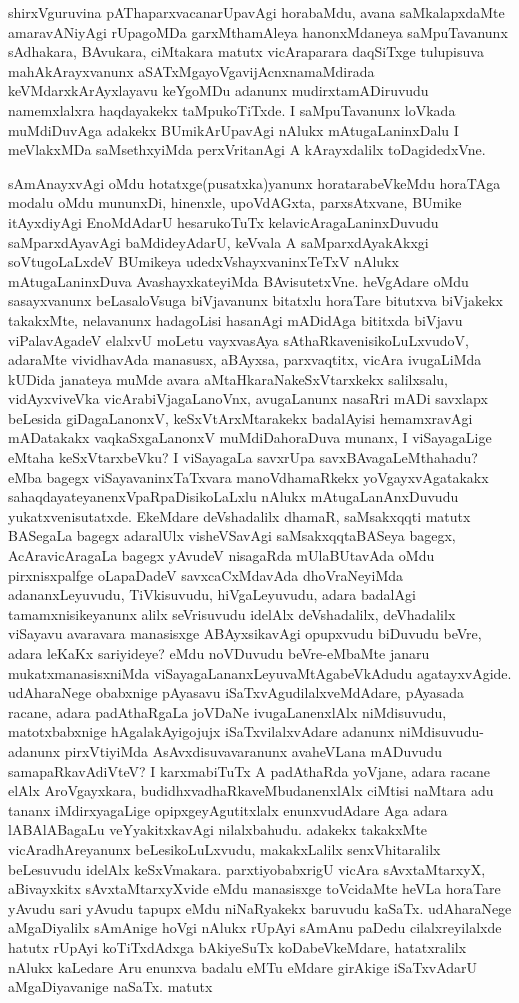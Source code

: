 shirxVguruvina pAThaparxvacanarUpavAgi horabaMdu, avana saMkalapxdaMte amaravANiyAgi rUpagoMDa garxMthamAleya hanonxMdaneya saMpuTavanunx sAdhakara, BAvukara, ciMtakara matutx vicAraparara daqSiTxge tulupisuva mahAkArayxvanunx aSATxMgayoVgavijAcnxnamaMdirada keVMdarxkArAyxlayavu keYgoMDu adanunx mudirxtamADiruvudu namemxlalxra haqdayakekx taMpukoTiTxde. I saMpuTavanunx loVkada muMdiDuvAga adakekx BUmikArUpavAgi nAlukx mAtugaLaninxDalu I meVlakxMDa saMsethxyiMda perxVritanAgi A kArayxdalilx toDagidedxVne.

sAmAnayxvAgi oMdu hotatxge(pusatxka)yanunx horatarabeVkeMdu horaTAga modalu oMdu  mununxDi, hinenxle, upoVdAGxta, parxsAtxvane, BUmike itAyxdiyAgi EnoMdAdarU hesarukoTuTx kelavicAragaLaninxDuvudu saMparxdAyavAgi baMdideyAdarU, keVvala A saMparxdAyakAkxgi soVtugoLaLxdeV BUmikeya udedxVshayxvaninxTeTxV nAlukx mAtugaLaninxDuva AvashayxkateyiMda BAvisutetxVne. heVgAdare oMdu sasayxvanunx beLasaloVsuga biVjavanunx bitatxlu horaTare bitutxva biVjakekx takakxMte, nelavanunx hadagoLisi hasanAgi mADidAga bititxda biVjavu viPalavAgadeV elalxvU moLetu vayxvasAya sAthaRkavenisikoLuLxvudoV, adaraMte vividhavAda \hbox{manasusx}, aBAyxsa, parxvaqtitx, vicAra ivugaLiMda kUDida janateya muMde avara aMtaHkaraNakeSxVtarxkekx salilxsalu, vidAyxviveVka vicArabiVjagaLanoVnx, avugaLanunx nasaRri mADi savxlapx beLesida giDagaLanonxV, keSxVtArxMtarakekx badalAyisi hemamxravAgi mADatakakx vaqkaSxgaLanonxV muMdiDahoraDuva munanx, I viSayagaLige eMtaha keSxVtarxbeVku? I viSayagaLa savxrUpa savxBAvagaLeMthahadu? eMba bagegx viSayavaninxTaTxvara manoVdhamaRkekx yoVgayxvAgatakakx sahaqdayateyanenxVpaRpaDisikoLaLxlu nAlukx mAtugaLanAnxDuvudu yukatxvenisutatxde. EkeMdare deVshadalilx dhamaR, saMsakxqqti matutx BASegaLa bagegx adaralUlx visheVSavAgi saMsakxqqtaBASeya bagegx, AcAravicAragaLa bagegx yAvudeV nisagaRda mUlaBUtavAda oMdu pirxnisxpalfge oLapaDadeV savxcaCxMdavAda dhoVraNeyiMda adananxLeyuvudu, TiVkisuvudu, hiVgaLeyuvudu, adara badalAgi tamamxnisikeyanunx alilx seVrisuvudu idelAlx deVshadalilx, deVhadalilx viSayavu avaravara manasisxge ABAyxsikavAgi opupxvudu biDuvudu beVre, adara leKaKx sariyideye? eMdu noVDuvudu beVre-eMbaMte janaru mukatxmanasisxniMda viSayagaLananxLeyuvaMtAgabeVkAdudu agatayxvAgide. udAharaNege obabxnige pAyasavu iSaTxvAgudilalxveMdAdare, pAyasada racane, adara padAthaRgaLa  joVDaNe ivugaLanenxlAlx niMdisuvudu, matotxbabxnige hAgalakAyigojujx iSaTxvilalxvAdare adanunx niMdisuvudu- adanunx pirxVtiyiMda AsAvxdisuvavaranunx avaheVLana mADuvudu samapaRkavAdiVteV? I karxmabiTuTx A padAthaRda yoVjane, adara racane elAlx AroVgayxkara, budidhxvadhaRkaveMbudanenxlAlx ciMtisi naMtara adu tananx iMdirxyagaLige opipxgeyAgutitxlalx enunxvudAdare Aga adara lABAlABagaLu veYyakitxkavAgi nilalxbahudu. adakekx takakxMte vicAradhAreyanunx beLesikoLuLxvudu, makakxLalilx senxVhitaralilx beLesuvudu idelAlx keSxVmakara. parxtiyobabxrigU vicAra sAvxtaMtarxyX, aBivayxkitx sAvxtaMtarxyXvide eMdu manasisxge toVcidaMte heVLa horaTare yAvudu sari yAvudu tapupx eMdu niNaRyakekx baruvudu kaSaTx. udAharaNege aMgaDiyalilx sAmAnige hoVgi nAlukx rUpAyi sAmAnu paDedu cilalxreyilalxde hatutx rUpAyi koTiTxdAdxga bAkiyeSuTx koDabeVkeMdare, hatatxralilx nAlukx kaLedare Aru enunxva badalu eMTu eMdare girAkige iSaTxvAdarU aMgaDiyavanige naSaTx. matutx 